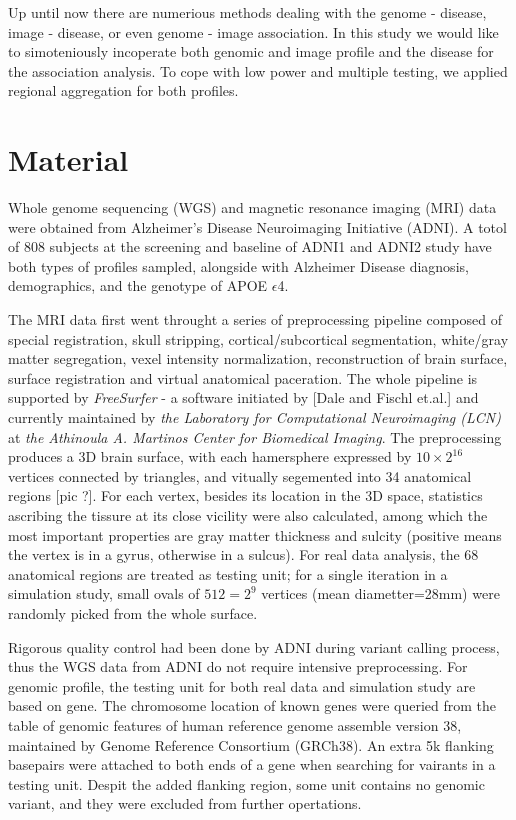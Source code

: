 \documentclass[twocolumn]{article}
\begin{document}
Up until now there are numerious methods dealing with the genome - disease, image - disease, or even genome - image association. In this study we would like to simoteniously incoperate both genomic and image profile and the disease for the association analysis. To cope with low power and multiple testing, we applied regional aggregation for both profiles.

\section{Material}
Whole genome sequencing (WGS) and magnetic resonance imaging (MRI) data were obtained from Alzheimer’s Disease Neuroimaging Initiative (ADNI). A totol of 808 subjects at the screening and baseline of ADNI1 and ADNI2 study have both types of profiles sampled, alongside with Alzheimer Disease diagnosis, demographics, and the genotype of APOE $\epsilon$4.

The MRI data first went throught a series of preprocessing pipeline composed of special registration, skull stripping, cortical/subcortical segmentation, white/gray matter segregation, vexel intensity normalization, reconstruction of brain surface, surface registration and virtual anatomical paceration. The whole pipeline is supported by \emph{FreeSurfer} - a software initiated by [Dale and Fischl et.al.] and currently maintained by \textit{the Laboratory for Computational Neuroimaging (LCN)}  at \textit {the Athinoula A. Martinos Center for Biomedical Imaging}. The preprocessing produces a 3D brain surface, with each hamersphere expressed by $10\times2^16$ vertices connected by triangles, and vitually segemented into 34 anatomical regions [pic ?]. For each vertex, besides its location in the 3D space, statistics ascribing the tissure at its close vicility were also calculated, among which the most important properties are gray matter thickness and sulcity (positive means the vertex is in a gyrus, otherwise in a sulcus). For real data analysis, the 68 anatomical regions are treated as testing unit; for a single iteration in a simulation study, small ovals of $512=2^9$ vertices (mean diametter=28mm) were randomly picked from the whole surface.

Rigorous quality control had been done by ADNI during variant calling process, thus the WGS data from ADNI do not require intensive preprocessing. For genomic profile, the testing unit for both real data and simulation study are based on gene. The chromosome location of known genes were queried from the table of genomic features of human reference genome assemble version 38, maintained by Genome Reference Consortium (GRCh38). An extra 5k flanking basepairs were attached to both ends of a gene when searching for vairants in a testing unit. Despit the added flanking region, some unit contains no genomic variant, and they were excluded from further opertations.
\end{document}
